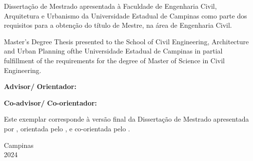 \def\titlepage{
    \large\bf
    \vfill
    \begin{center}
        \@author
        \vfill
            \@title
            \vskip 8mm
        \titulo
    \end{center}
    \vfill
    \normalfont
    \normalsize
    \hfill\begin{minipage}[t]{0.54\textwidth}
        Disserta\c{c}\~{a}o de Mestrado apresentada \`{a} Faculdade de Engenharia Civil, Arquitetura e Urbanismo da Universidade Estadual de Campinas como parte dos requisitos para a obten\c{c}\~{a}o do t\'{i}tulo de Mestre, na área de Engenharia Civil.
    \end{minipage}
        \vskip 8mm
        \hfill\begin{minipage}[t]{0.54\textwidth}
            Master's Degree Thesis presented to the School of Civil Engineering, Architecture and Urban Planning ofthe Universidade Estadual de Campinas in partial fulfillment of the requirements for the degree of Master of Science in Civil Engineering.
        \end{minipage}
        \vskip 8mm
        \vfill
        {\bf Advisor/}\hspace{-0.9ex}
        {\bf Orientador: \advisor}

        {\bf Co-advisor/}\hspace{-0.7ex}
        {\bf Co-orientador: \coadvisor}
    \vfill
        \begin{minipage}[t]{0.5\textwidth}
            Este exemplar corresponde \`{a} vers\~{a}o final da Disserta\c{c}\~{a}o de Mestrado apresentada por \@author, orientada pelo \advisor \xspace, e co-orientada pelo \coadvisor.
        \end{minipage}
    \vfill
    \begin{center}
        \large
        Campinas\\ 2024
    \end{center}
}

\titlepage